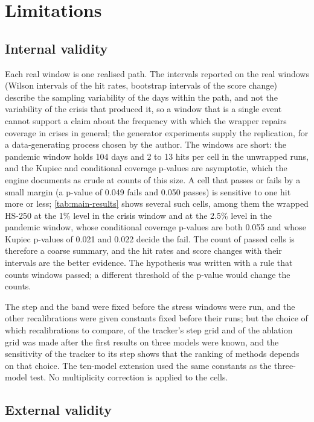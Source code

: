 \section{Limitations}
\label{sec:limitations}

\subsection{Internal validity}
\label{sec:limits-internal}

Each real window is one realised path. The intervals reported on the real windows (Wilson intervals of the hit rates, bootstrap intervals of the score change) describe the sampling variability of the days within the path, and not the variability of the crisis that produced it, so a window that is a single event cannot support a claim about the frequency with which the wrapper repairs coverage in crises in general; the generator experiments supply the replication, for a data-generating process chosen by the author. The windows are short: the pandemic window holds 104 days and 2 to 13 hits per cell in the unwrapped runs, and the Kupiec and conditional coverage p-values are asymptotic, which the engine documents as crude at counts of this size. A cell that passes or fails by a small margin (a p-value of 0.049 fails and 0.050 passes) is sensitive to one hit more or less; \cref{tab:main-results} shows several such cells, among them the wrapped HS-250 at the 1\% level in the crisis window and at the 2.5\% level in the pandemic window, whose conditional coverage p-values are both 0.055 and whose Kupiec p-values of 0.021 and 0.022 decide the fail. The count of passed cells is therefore a coarse summary, and the hit rates and score changes with their intervals are the better evidence. The hypothesis was written with a rule that counts windows passed; a different threshold of the p-value would change the counts.

The step and the band were fixed before the stress windows were run, and the other recalibrations were given constants fixed before their runs; but the choice of which recalibrations to compare, of the tracker's step grid and of the ablation grid was made after the first results on three models were known, and the sensitivity of the tracker to its step shows that the ranking of methods depends on that choice. The ten-model extension used the same constants as the three-model test. No multiplicity correction is applied to the \tenRuns{} cells.

\subsection{External validity}
\label{sec:limits-external}

